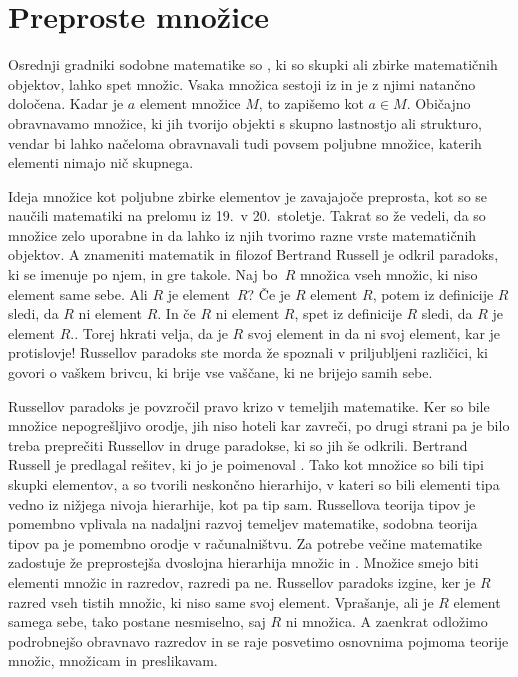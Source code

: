 \chapter{Preproste množice}
\label{cha:preproste-mnozice}


Osrednji gradniki sodobne matematike so , ki so skupki ali zbirke matematičnih
objektov, lahko spet množic. Vsaka množica sestoji iz  in je z njimi
natančno določena. Kadar je $a$ element množice $M$, to zapišemo kot $a \in M$. Običajno
obravnavamo množice, ki jih tvorijo objekti s skupno lastnostjo ali strukturo, vendar bi
lahko načeloma obravnavali tudi povsem poljubne množice, katerih elementi nimajo nič
skupnega.

Ideja množice kot poljubne zbirke elementov je zavajajoče preprosta, kot so se naučili
matematiki na prelomu iz 19.~v 20.~stoletje. Takrat so že vedeli, da so množice zelo
uporabne in da lahko iz njih tvorimo razne vrste matematičnih objektov. A znameniti
matematik in filozof Bertrand Russell je odkril paradoks, ki se imenuje po njem, in gre
takole. Naj bo~$R$ množica vseh množic, ki niso element same sebe. Ali $R$ je element~$R$?
Če je $R$ element $R$, potem iz definicije $R$ sledi, da $R$ ni element $R$. In če $R$ ni
element $R$, spet iz definicije $R$ sledi, da $R$ je element $R$.. Torej hkrati velja, da
je $R$ svoj element in da ni svoj element, kar je protislovje! Russellov paradoks ste
morda že spoznali v priljubljeni različici, ki govori o vaškem brivcu, ki brije vse
vaščane, ki ne brijejo samih sebe.

Russellov paradoks je povzročil pravo krizo v temeljih matematike. Ker so bile množice
nepogrešljivo orodje, jih niso hoteli kar zavreči, po drugi strani pa je bilo treba
preprečiti Russellov in druge paradokse, ki so jih še odkrili. Bertrand Russell je
predlagal rešitev, ki jo je poimenoval . Tako kot množice so bili tipi
skupki elementov, a so tvorili neskončno hierarhijo, v kateri so bili elementi tipa vedno
iz nižjega nivoja hierarhije, kot pa tip sam. Russellova teorija tipov je pomembno vplivala na
nadaljni razvoj temeljev matematike, sodobna teorija tipov pa je pomembno orodje v
računalništvu. Za potrebe večine matematike zadostuje že preprostejša dvoslojna hierarhija
množic in . Množice smejo biti elementi množic in razredov, razredi pa ne.
Russellov paradoks izgine, ker je $R$ razred vseh tistih množic, ki niso same svoj
element. Vprašanje, ali je $R$ element samega sebe, tako postane nesmiselno, saj $R$ ni
množica. A zaenkrat odložimo podrobnejšo obravnavo razredov in se raje posvetimo osnovnima
pojmoma teorije množic, množicam in preslikavam.

